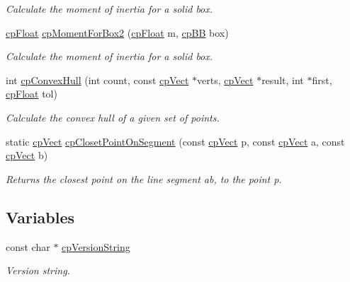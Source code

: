 \begin{DoxyCompactItemize}
\begin{DoxyCompactList}\small\item\em Calculate the moment of inertia for a solid box. \end{DoxyCompactList}\item 
\hypertarget{group__misc_ga435b78dde186a991f207df58d88e88d2}{}\hyperlink{group__basic_types_gac1ed65573e035bf892505768c852d8d3}{cp\+Float} \hyperlink{group__misc_ga435b78dde186a991f207df58d88e88d2}{cp\+Moment\+For\+Box2} (\hyperlink{group__basic_types_gac1ed65573e035bf892505768c852d8d3}{cp\+Float} m, \hyperlink{structcp_b_b}{cp\+B\+B} box)\label{group__misc_ga435b78dde186a991f207df58d88e88d2}

\begin{DoxyCompactList}\small\item\em Calculate the moment of inertia for a solid box. \end{DoxyCompactList}\item 
int \hyperlink{group__misc_ga4468d521319fa699354b8d0e1d9532fe}{cp\+Convex\+Hull} (int count, const \hyperlink{structcp_vect}{cp\+Vect} $\ast$verts, \hyperlink{structcp_vect}{cp\+Vect} $\ast$result, int $\ast$first, \hyperlink{group__basic_types_gac1ed65573e035bf892505768c852d8d3}{cp\+Float} tol)
\begin{DoxyCompactList}\small\item\em Calculate the convex hull of a given set of points. \end{DoxyCompactList}\item 
\hypertarget{group__misc_ga9511599966ddc56c0fe81c3a943db25e}{}static \hyperlink{structcp_vect}{cp\+Vect} \hyperlink{group__misc_ga9511599966ddc56c0fe81c3a943db25e}{cp\+Closet\+Point\+On\+Segment} (const \hyperlink{structcp_vect}{cp\+Vect} p, const \hyperlink{structcp_vect}{cp\+Vect} a, const \hyperlink{structcp_vect}{cp\+Vect} b)\label{group__misc_ga9511599966ddc56c0fe81c3a943db25e}

\begin{DoxyCompactList}\small\item\em Returns the closest point on the line segment ab, to the point p. \end{DoxyCompactList}\end{DoxyCompactItemize}
\subsection*{Variables}
\begin{DoxyCompactItemize}
\item 
\hypertarget{group__misc_gacecd153caab362b7e2e33b4f37a0fe55}{}const char $\ast$ \hyperlink{group__misc_gacecd153caab362b7e2e33b4f37a0fe55}{cp\+Version\+String}\label{group__misc_gacecd153caab362b7e2e33b4f37a0fe55}

\begin{DoxyCompactList}\small\item\em Version string. \end{DoxyCompactList}\end{DoxyCompactItemize}


